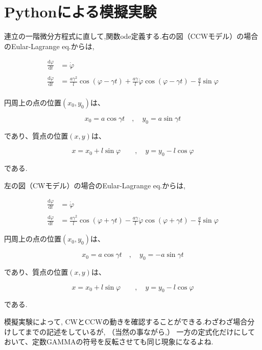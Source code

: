 \section{Pythonによる模擬実験}

連立の一階微分方程式に直して,関数ode定義する.右の図（CCWモデル）の場合のEular-Lagrange eq.からは,

\begin{align*}
   \displaystyle\frac{\mathrm{d}\varphi}{\mathrm{d}t}&=\dot{\varphi}\\\\
   \displaystyle\frac{\mathrm{d}\dot{\varphi}}{\mathrm{d}t}&=\displaystyle\frac{a\gamma^2}{l}\cos(\varphi-\gamma t) +\frac{a\gamma}{l}\dot{\varphi}\cos(\varphi-\gamma t)- \frac{g}{l}\sin\varphi
\end{align*}\\

円周上の点の位置$(x_0,y_0)$は、

\[x_0=a\cos\gamma t \quad,\quad y_0=a\sin\gamma t\]

であり、質点の位置$(x,y)$は、

\[x=x_0 + l\sin\varphi \qquad,\quad y=y_0 - l\cos\varphi\]

である.

左の図（CWモデル）の場合のEular-Lagrange eq.からは,

\begin{align*}
   \displaystyle\frac{\mathrm{d}\varphi}{\mathrm{d}t}&=\dot{\varphi}\\\\
   \displaystyle\frac{\mathrm{d}\dot{\varphi}}{\mathrm{d}t}&=\displaystyle\frac{a\gamma^2}{l}\cos(\varphi+\gamma t) -\frac{a\gamma}{l}\dot{\varphi}\cos(\varphi+\gamma t)- \frac{g}{l}\sin\varphi
\end{align*}

円周上の点の位置$(x_0,y_0)$は、

\[x_0=a\cos\gamma t \quad,\quad y_0=-a\sin\gamma t\]

であり、質点の位置$(x,y)$は、

\[x=x_0 + l\sin\varphi \qquad,\quad y=y_0 - l\cos\varphi\]

である.

模擬実験によって, CWとCCWの動きを確認することができる.わざわざ場合分けしてまでの記述をしているが, （当然の事ながら,） 一方の定式化だけにしておいて、定数GAMMAの符号を反転させても同じ現象になるよね.

\lstset{escapechar=@,style=custompy}

